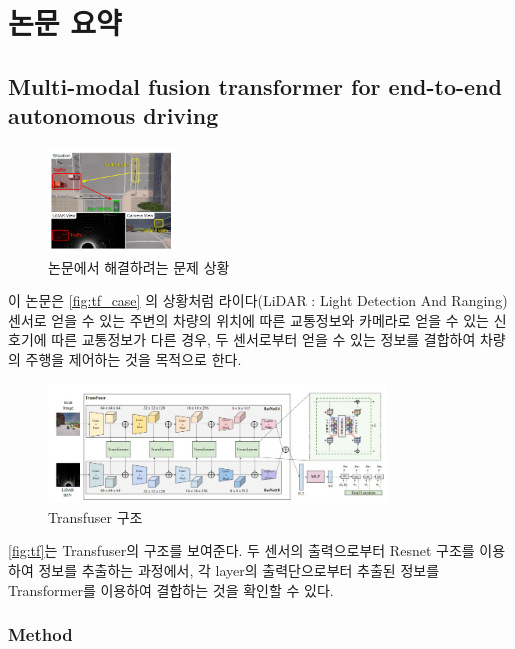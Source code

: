 \section{논문 요약}{\label{sec:review}}

\subsection{Multi-modal fusion transformer for end-to-end autonomous driving}{\label{subsec:Transfuser}}
\begin{figure}[htp]
    \centering
    \includegraphics[width=0.3\textwidth]{figures/Transfuser_case.png}
    \caption{논문에서 해결하려는 문제 상황}
    \label{fig:tf_case}
\end{figure}
이 논문은 \autoref{fig:tf_case} 의 상황처럼
라이다(LiDAR : Light Detection And Ranging) 센서로 얻을 수 있는 주변의 차량의 위치에 따른 교통정보와
카메라로 얻을 수 있는 신호기에 따른 교통정보가 다른 경우,
두 센서로부터 얻을 수 있는 정보를 결합하여 차량의 주행을 제어하는 것을 목적으로 한다.
\begin{figure}[htp]
    \centering
    \includegraphics[width=0.8\textwidth]{figures/Transfuser.png}
    \caption{Transfuser 구조}
    \label{fig:tf}
\end{figure}
\autoref{fig:tf}는 Transfuser의 구조를 보여준다.
두 센서의 출력으로부터 Resnet 구조\cite{Resnet}를 이용하여 정보를 추출하는 과정에서,
각 layer의 출력단으로부터 추출된 정보를 Transformer\cite{Transformer}를 이용하여 결합하는 것을 확인할 수 있다.

\subsubsection{Method}{\label{subsubsec:tf_method}}
